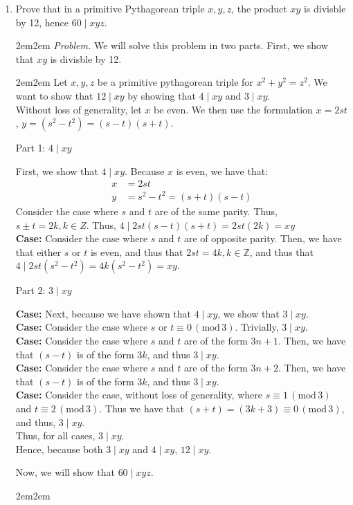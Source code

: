 \documentclass[10pt,oneside]{book}
\newcommand{\Z}{\mathbb{Z}}\newcommand{\R}{\mathbb{R}}\newcommand{\N}{\mathbb{N}}
\newcommand{\gspc}{\vspace{0.13cm}} %
\newcommand{\gline}{\gspc\\} %
\newcommand{\gmod}[1]{\,(\text{mod}\,#1)}
\newcommand{\centerit}[1]{{\begin{center} #1 \end{center}}}
\let\endoldproof\endproof
\renewenvironment{proof}[1][\proofname]
  {\vspace{0.2cm}\begin{adjustwidth}{2em}{2em}
   \oldproof[#1]}
  {\endoldproof
\end{adjustwidth}}
\newenvironment{problem}[1]
  {\vspace{-0.1cm}\begin{coloredadjust}\begin{adjustwidth}{2em}{2em}
   \textit{Problem. }#1}
  {\endoldproof
\end{adjustwidth}\end{coloredadjust}\gspc}
\begin{document}
\begin{enumerate}
\begin{enumerate}
\begin{problem}
\begin{enumerate}
      \end{enumerate}
      These just follow the formulation $s^2 - t^2$ and $s^2 + t^2$. 
    \end{problem}
  \end{enumerate}
  \item Prove that in a primitive Pythagorean triple $x, y, z$, the product $xy$ is divisble by 12, hence $60\mid xyz$.
  \begin{problem}
    We will solve this problem in two parts. First, we show that $xy$ is divisble by 12.
    \begin{proof}
      Let $x, y, z$ be a primitive pythagorean triple for $x^2 + y^2 = z^2$. We want to show that $12 \mid xy$ by showing that $4\mid xy$ and $3\mid xy$. \gline
      Without loss of generality, let $x$ be even. We then use the formulation $x = 2st$, $y=(s^2-t^2)=(s-t)(s+t)$. 
      \centerit{Part 1: $4\mid xy$}
      First, we show that $4\mid xy$. Because $x$ is even, we have that:
      \begin{align*}
        x &= 2st\\
        y &= s^2 - t^2=(s+t)(s-t)
      \end{align*}
      Consider the case where $s$ and $t$ are of the same parity. Thus, $s\pm t = 2k,k\in Z$. Thus, $4\mid 2st(s-t)(s+t) = 2st(2k) = xy$\gline
      \textbf{Case: }Consider the case where $s$ and $t$ are of opposite parity. Then, we have that either $s$ or $t$ is even, and thus that $2st = 4k, k\in\Z$, and thus that $4\mid 2st(s^2-t^2) = 4k(s^2-t^2)=xy$.
      \centerit{Part 2: $3\mid xy$}
      \textbf{Case: }Next, because we have shown that $4\mid xy$, we show that $3\mid xy$. \gline
      \textbf{Case: }Consider the case where $s$ or $t\equiv 0\gmod 3$. Trivially, $3\mid xy$.\\
      \textbf{Case: }Consider the case where $s$ and $t$ are of the form $3n + 1$. Then, we have that $(s-t)$ is of the form $3k$, and thus $3\mid xy$.\gline
      \textbf{Case: }Consider the case where $s$ and $t$ are of the form $3n+2$. Then, we have that $(s-t)$ is of the form $3k$, and thus $3\mid xy$. \gline
      \textbf{Case: }Consider the case, without loss of generality, where $s\equiv 1\gmod 3$ and $t\equiv 2\gmod 3$. Thus we have that $(s+t)=(3k+3)\equiv 0\gmod 3$, and thus, $3\mid xy$.\gline
      Thus, for all cases, $3\mid xy$.\gline
      Hence, because both $3\mid xy$ and $4\mid xy$, $12\mid xy$. 
    \end{proof}
    Now, we will show that $60\mid xyz$. 
    \begin{proof}

\end{proof}
\end{problem}
\end{enumerate}
\end{document}
